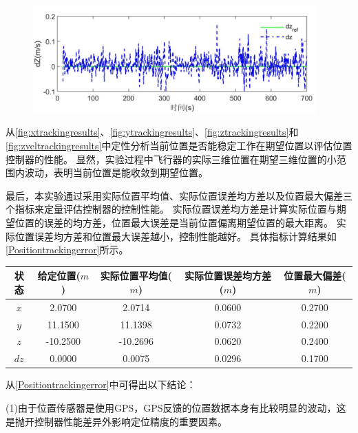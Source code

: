 \documentclass[
  type=master
]{gdutthesis}
\begin{document}
\begin{figure}[H]
	\centering
	\includegraphics[width=0.97\textwidth]{屏幕截图 2022-04-10 194636.png}
	\label{fig:zveltrackingresults}
\end{figure}

从\autoref{fig:xtrackingresults}、\autoref{fig:ytrackingresults}、\autoref{fig:ztrackingresults}和\autoref{fig:zveltrackingresults}中定性分析当前位置是否能稳定工作在期望位置以评估位置控制器的性能。
显然，实验过程中飞行器的实际三维位置在期望三维位置的小范围内波动，表明当前位置是能收敛到期望位置。

最后，本实验通过采用实际位置平均值、实际位置误差均方差以及位置最大偏差三个指标来定量评估控制器的控制性能。
实际位置误差均方差是计算实际位置与期望位置的误差的均方差，位置最大误差是当前位置偏离期望位置的最大距离。
实际位置误差均方差和位置最大误差越小，控制性能越好。
具体指标计算结果如\autoref{Positiontrackingerror}所示。
\begin{table}[H]
	\label{Positiontrackingerror}
	\begin{tabular}{ccccc}
		\toprule
		状态 & 给定位置($m$) & 实际位置平均值($m$) & 实际位置误差均方差($m$) & 位置最大偏差($m$)\\
		\midrule
		$x$ & 2.0700 & 2.0714 & 0.0600 & 0.2700 \\ 
		$y$ & 11.1500 & 11.1398 & 0.0732 & 0.2200 \\
		$z$ & -10.2500 & -10.2696 & 0.0620 & 0.2400 \\
		$dz$ & 0.0000 & 0.0075 & 0.0296 & 0.1700 \\
		\bottomrule 
	\end{tabular}
\end{table}

从\autoref{Positiontrackingerror}中可得出以下结论：

(1)由于位置传感器是使用GPS，GPS反馈的位置数据本身有比较明显的波动，这是抛开控制器性能差异外影响定位精度的重要因素。
\end{document}
